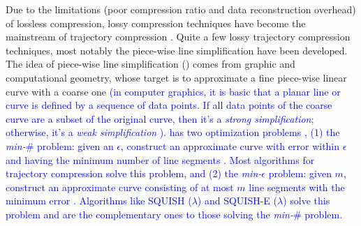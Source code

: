 Due to the  limitations (poor compression ratio and data reconstruction overhead) of lossless compression, lossy compression techniques have become the mainstream of trajectory compression \cite{Lin:Operb,Zhang:Evaluation}. Quite a few lossy trajectory compression techniques, most notably the piece-wise line simplification \cite{Keogh:online,Liu:BQS, Muckell:Compression, Chen:Trajectory, Chen:Fast, Cao:Spatio,Shi:Survey,Cao:Dots,Chen:Compression,Ghica:DTracking,Ke:Interval,Lange:Tracking,Lin:Cised,Lin:Operb,Liu:Amnesic,Long:Direction,Meratnia:Spatiotemporal,Muckell:SQUISH,Trajcevski:DDR,Wu:Graph} have been developed. 
%
The idea of piece-wise line simplification (\lsa) comes from graphic and computational geometry, whose target is to approximate a fine piece-wise linear curve with a coarse one \textcolor{blue}{(in computer graphics, it is basic that a planar line or curve is defined by a sequence of data points\cite{Williams:Bounded}. If all data points of the coarse curve are a subset of the original curve, then it's a \emph{strong simplification}; otherwise, it's a \emph{weak simplification} \cite{Trajcevski:DDR}). \lsa has two optimization problems \cite{Chan:Optimal, Imai:Optimal,Pavlidis:Segment}, (1) the \emph{min-$\#$} problem: given an $\epsilon$, construct an approximate curve with error within $\epsilon$ and having the minimum number of line segments \cite{Chan:Optimal, Imai:Optimal}. Most \lsa algorithms for trajectory compression \cite{Douglas:Peucker, Hershberger:Speeding, Keogh:online,Liu:BQS, Muckell:Compression, Chen:Trajectory, Chen:Fast, Cao:Spatio,Cao:Dots,Chen:Compression,Ghica:DTracking,Ke:Interval,Lange:Tracking,Lin:Cised,Lin:Operb,Liu:Amnesic,Long:Direction,Meratnia:Spatiotemporal,Trajcevski:DDR,Wu:Graph} solve this problem, and} 
\textcolor{blue}{(2) the \emph{min-$\epsilon$} problem: given $m$, construct an approximate curve consisting of at most $m$ line segments with the minimum error \cite{Chan:Optimal, Imai:Optimal}. Algorithms like SQUISH ($\lambda$) \cite{Muckell:SQUISH} and SQUISH-E ($\lambda$) \cite{Muckell:Compression} solve this problem and are the complementary ones to those solving the \emph{min-$\#$} problem.}
